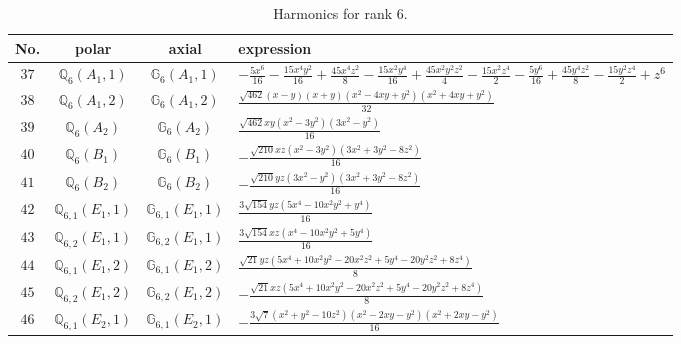 \documentclass[fleqn,8pt,landscape]{jsarticle}
\begin{document}
\begin{table}[ht!]
\begin{center}
\caption{Harmonics for rank 6.}
\renewcommand{\arraystretch}{1.3}
\begin{tabular}{cccl} \hline \hline
No. & polar & axial & expression \\ \hline
$ 37 $ & $ \mathbb{Q}_{6}(A_{1},1) $ & $ \mathbb{G}_{6}(A_{1},1) $ & $ - \frac{5 x^{6}}{16} - \frac{15 x^{4} y^{2}}{16} + \frac{45 x^{4} z^{2}}{8} - \frac{15 x^{2} y^{4}}{16} + \frac{45 x^{2} y^{2} z^{2}}{4} - \frac{15 x^{2} z^{4}}{2} - \frac{5 y^{6}}{16} + \frac{45 y^{4} z^{2}}{8} - \frac{15 y^{2} z^{4}}{2} + z^{6} $ \\
$ 38 $ & $ \mathbb{Q}_{6}(A_{1},2) $ & $ \mathbb{G}_{6}(A_{1},2) $ & $ \frac{\sqrt{462} \left(x - y\right) \left(x + y\right) \left(x^{2} - 4 x y + y^{2}\right) \left(x^{2} + 4 x y + y^{2}\right)}{32} $ \\
$ 39 $ & $ \mathbb{Q}_{6}(A_{2}) $ & $ \mathbb{G}_{6}(A_{2}) $ & $ \frac{\sqrt{462} x y \left(x^{2} - 3 y^{2}\right) \left(3 x^{2} - y^{2}\right)}{16} $ \\
$ 40 $ & $ \mathbb{Q}_{6}(B_{1}) $ & $ \mathbb{G}_{6}(B_{1}) $ & $ - \frac{\sqrt{210} x z \left(x^{2} - 3 y^{2}\right) \left(3 x^{2} + 3 y^{2} - 8 z^{2}\right)}{16} $ \\
$ 41 $ & $ \mathbb{Q}_{6}(B_{2}) $ & $ \mathbb{G}_{6}(B_{2}) $ & $ - \frac{\sqrt{210} y z \left(3 x^{2} - y^{2}\right) \left(3 x^{2} + 3 y^{2} - 8 z^{2}\right)}{16} $ \\
$ 42 $ & $ \mathbb{Q}_{6,1}(E_{1},1) $ & $ \mathbb{G}_{6,1}(E_{1},1) $ & $ \frac{3 \sqrt{154} y z \left(5 x^{4} - 10 x^{2} y^{2} + y^{4}\right)}{16} $ \\
$ 43 $ & $ \mathbb{Q}_{6,2}(E_{1},1) $ & $ \mathbb{G}_{6,2}(E_{1},1) $ & $ \frac{3 \sqrt{154} x z \left(x^{4} - 10 x^{2} y^{2} + 5 y^{4}\right)}{16} $ \\
$ 44 $ & $ \mathbb{Q}_{6,1}(E_{1},2) $ & $ \mathbb{G}_{6,1}(E_{1},2) $ & $ \frac{\sqrt{21} y z \left(5 x^{4} + 10 x^{2} y^{2} - 20 x^{2} z^{2} + 5 y^{4} - 20 y^{2} z^{2} + 8 z^{4}\right)}{8} $ \\
$ 45 $ & $ \mathbb{Q}_{6,2}(E_{1},2) $ & $ \mathbb{G}_{6,2}(E_{1},2) $ & $ - \frac{\sqrt{21} x z \left(5 x^{4} + 10 x^{2} y^{2} - 20 x^{2} z^{2} + 5 y^{4} - 20 y^{2} z^{2} + 8 z^{4}\right)}{8} $ \\
$ 46 $ & $ \mathbb{Q}_{6,1}(E_{2},1) $ & $ \mathbb{G}_{6,1}(E_{2},1) $ & $ - \frac{3 \sqrt{7} \left(x^{2} + y^{2} - 10 z^{2}\right) \left(x^{2} - 2 x y - y^{2}\right) \left(x^{2} + 2 x y - y^{2}\right)}{16} $ \\

\end{tabular}
\end{center}
\end{table}
\end{document}
